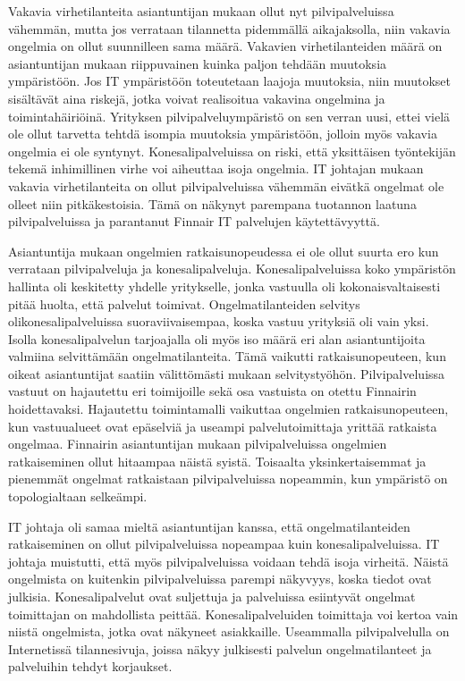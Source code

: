 Vakavia virhetilanteita asiantuntijan mukaan ollut nyt pilvipalveluissa vähemmän, mutta jos verrataan tilannetta pidemmällä aikajaksolla, niin vakavia ongelmia on ollut suunnilleen sama määrä. Vakavien virhetilanteiden määrä on asiantuntijan mukaan riippuvainen kuinka paljon tehdään muutoksia ympäristöön. Jos IT ympäristöön toteutetaan laajoja muutoksia, niin muutokset sisältävät aina riskejä, jotka voivat realisoitua vakavina ongelmina ja toimintahäiriöinä. Yrityksen pilvipalveluympäristö on sen verran uusi, ettei vielä ole ollut tarvetta tehtdä isompia muutoksia ympäristöön, jolloin myös vakavia ongelmia ei ole syntynyt. Konesalipalveluissa on riski, että yksittäisen työntekijän tekemä inhimillinen virhe voi aiheuttaa isoja ongelmia. IT johtajan mukaan vakavia virhetilanteita on ollut pilvipalveluissa vähemmän eivätkä ongelmat ole olleet niin pitkäkestoisia. Tämä on näkynyt parempana tuotannon laatuna pilvipalveluissa ja parantanut Finnair IT palvelujen käytettävyyttä.

Asiantuntija mukaan ongelmien ratkaisunopeudessa ei ole ollut suurta ero kun verrataan pilvipalveluja ja konesalipalveluja. Konesalipalveluissa koko ympäristön hallinta oli keskitetty yhdelle yritykselle, jonka vastuulla oli kokonaisvaltaisesti pitää huolta, että palvelut toimivat. Ongelmatilanteiden selvitys olikonesalipalveluissa suoraviivaisempaa, koska vastuu yrityksiä oli vain yksi. Isolla konesalipalvelun tarjoajalla oli myös iso määrä eri alan asiantuntijoita valmiina selvittämään ongelmatilanteita. Tämä vaikutti ratkaisunopeuteen, kun oikeat asiantuntijat saatiin välittömästi mukaan selvitystyöhön. Pilvipalveluissa vastuut on hajautettu eri toimijoille sekä osa vastuista on otettu Finnairin hoidettavaksi. Hajautettu toimintamalli vaikuttaa ongelmien ratkaisunopeuteen, kun vastuualueet ovat epäselviä ja useampi palvelutoimittaja yrittää ratkaista ongelmaa. Finnairin asiantuntijan mukaan pilvipalveluissa ongelmien ratkaiseminen ollut hitaampaa näistä syistä. Toisaalta yksinkertaisemmat ja pienemmät ongelmat ratkaistaan pilvipalveluissa nopeammin, kun ympäristö on topologialtaan selkeämpi.

IT johtaja oli samaa mieltä asiantuntijan kanssa, että ongelmatilanteiden ratkaiseminen on ollut pilvipalveluissa nopeampaa kuin konesalipalveluissa. IT johtaja muistutti, että myös pilvipalveluissa voidaan tehdä isoja virheitä. Näistä ongelmista on kuitenkin pilvipalveluissa parempi näkyvyys, koska tiedot ovat julkisia. Konesalipalvelut ovat suljettuja ja palveluissa esiintyvät ongelmat toimittajan on mahdollista peittää. Konesalipalveluiden toimittaja voi kertoa vain niistä ongelmista, jotka ovat näkyneet asiakkaille. Useammalla pilvipalvelulla on Internetissä tilannesivuja, joissa näkyy julkisesti palvelun ongelmatilanteet ja palveluihin tehdyt korjaukset.

